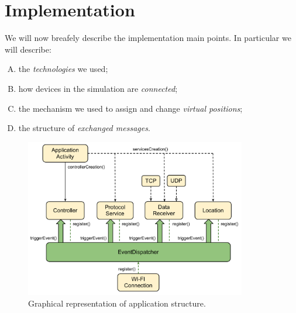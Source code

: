\section{Implementation}

We will now breafely describe the implementation main points. In particular we will describe:
	\begin{enumerate}[A.]
		\item the \textit{technologies} we used;
		\item how devices in the simulation are \textit{connected};
		\item the mechanism we used to assign and change \textit{virtual positions};
		\item the structure of \textit{exchanged messages}.
	\end{enumerate}
\begin{figure}[htbp]
	\centering
	\includegraphics[width=3.8in]{imgs/components_architecture.pdf}
	\caption{Graphical representation of application structure.}
	\label{fig:positions}
\end{figure}




